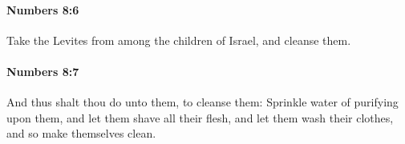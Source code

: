 		\paragraph{Numbers 8:6} %
			\label{NUMBERS-8-6}

			Take the Levites from among the children of Israel, and cleanse them.


		\paragraph{Numbers 8:7} %
			\label{NUMBERS-8-7}

			And thus shalt thou do unto them, to cleanse them: Sprinkle water of purifying upon them, and let them shave all their flesh, and let them wash their clothes, and so make themselves clean.


